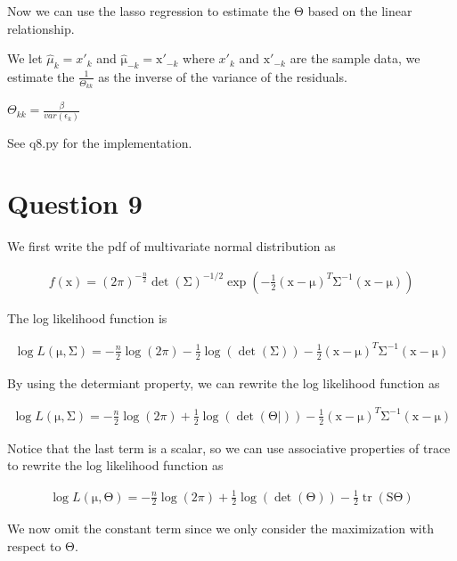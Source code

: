 \documentclass{article}
\newcommand{\vect}[1]{\boldsymbol{\mathrm{#1}}}
\DeclareMathOperator{\tr}{tr}
\begin{document}
Now we can use the lasso regression to estimate the \(\vect \Theta\) based on the linear relationship.

We let \(\hat \mu_k = x'_k\) and \(\hat{\vect{\mu}}_{-k} = \vect x'_{-k}\) where \(x'_k\) and \(\vect x'_{-k}\) are the sample data, we estimate the \(\frac{1}{\Theta_{kk}}\) as the inverse of the variance of the residuals.

\(\Theta_{kk} = \frac{\beta}{var(\epsilon_k)}\)

See q8.py for the implementation.

\section*{Question 9}

We first write the pdf of multivariate normal distribution as

\begin{align*}
  f(\vect x) = (2\pi)^{-\frac{n}{2}} \det(\vect \Sigma)^{-1/2} \exp\left(-\frac{1}{2} (\vect x - \vect \mu)^T\vect \Sigma^{-1}(\vect x - \vect \mu)\right)
\end{align*}

The log likelihood function is

\begin{align*}
  \log L(\vect \mu, \vect \Sigma) = -\frac{n}{2} \log(2\pi) - \frac{1}{2} \log(\det(\vect \Sigma)) - \frac{1}{2} (\vect x - \vect \mu)^T\vect \Sigma^{-1}(\vect x - \vect \mu)
\end{align*}

By using the determiant property, we can rewrite the log likelihood function as

\begin{align*}
  \log L(\vect \mu, \vect \Sigma) = -\frac{n}{2} \log(2\pi) + \frac{1}{2} \log(\det(\vect \Theta|)) - \frac{1}{2} (\vect x - \vect \mu)^T\vect \Sigma^{-1}(\vect x - \vect \mu)
\end{align*}

Notice that the last term is a scalar, so we can use associative properties of trace to rewrite the log likelihood function as

\begin{align*}
  \log L(\vect \mu, \vect \Theta) = -\frac{n}{2} \log(2\pi) + \frac{1}{2} \log(\det(\vect \Theta)) - \frac{1}{2} \tr(\vect S \vect \Theta)
\end{align*}

We now omit the constant term since we only consider the maximization with respect to \(\vect \Theta\).
\end{document}
